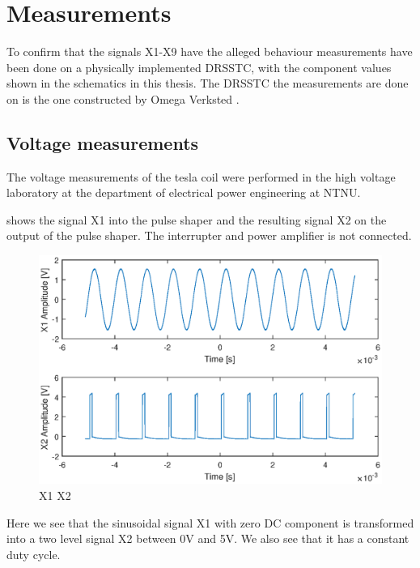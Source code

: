 
\chapter{Measurements}
To confirm that the signals X1-X9 have the alleged behaviour measurements have been done on a physically implemented DRSSTC, with the component values shown in the schematics in this thesis. The DRSSTC the measurements are done on is the one constructed by Omega Verksted \citep{prosjektoppgave} \citep{githubtesla}.


\section{Voltage measurements}
The voltage measurements of the tesla coil were performed in the high voltage laboratory at the department of electrical power engineering at NTNU.

 shows the signal X1 into the pulse shaper and the resulting signal X2 on the output of the pulse shaper. The interrupter and power amplifier is not connected.

\begin{figure}[H]
    \centering
    \includegraphics[trim={1cm 0cm 1cm 0cm},clip,width=\textwidth]{img/X1-X2.eps}
    \caption{X1 X2}
    \label{fig:m_x1-x2}
\end{figure}

Here we see that the sinusoidal signal X1 with zero DC component is transformed into a two level signal X2 between 0V and 5V. We also see that it has a constant duty cycle.

